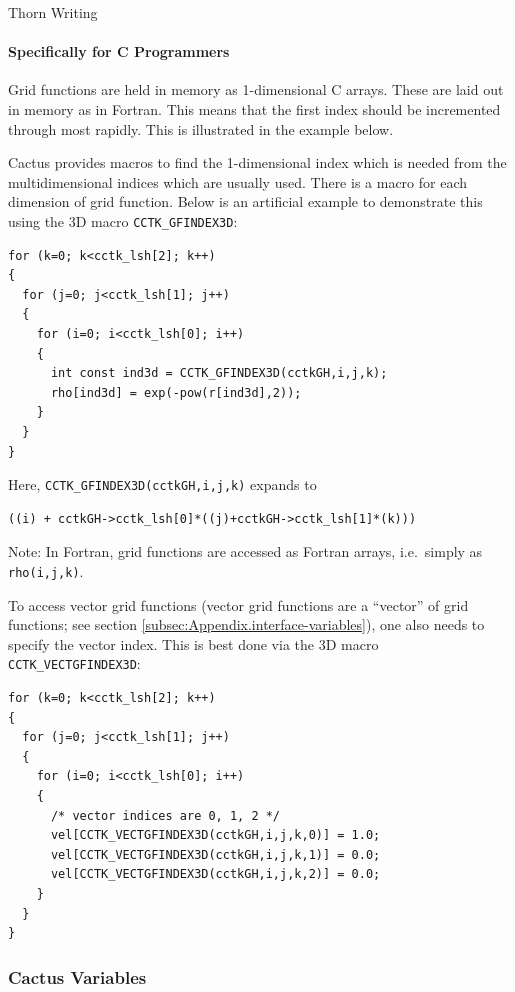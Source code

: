 \begin{cactuspart}{Thorn Writing}
\paragraph{Specifically for C Programmers}

Grid functions are held in memory as 1-dimensional C arrays. These are laid
out in memory as in Fortran. This means that the first index should
be incremented through most rapidly.  This is illustrated in the example
below.

Cactus provides
macros to find the 1-dimensional index which is needed from the multidimensional
indices which are usually used. There is a macro for each dimension of
grid function.  Below is an artificial example to demonstrate this
using the 3D macro \texttt{CCTK\_GFINDEX3D}:
\begin{verbatim}
for (k=0; k<cctk_lsh[2]; k++)
{
  for (j=0; j<cctk_lsh[1]; j++)
  {
    for (i=0; i<cctk_lsh[0]; i++)
    {
      int const ind3d = CCTK_GFINDEX3D(cctkGH,i,j,k);
      rho[ind3d] = exp(-pow(r[ind3d],2));
    }
  }
}
\end{verbatim}
%
Here, \verb|CCTK_GFINDEX3D(cctkGH,i,j,k)| expands to
\begin{verbatim}
((i) + cctkGH->cctk_lsh[0]*((j)+cctkGH->cctk_lsh[1]*(k)))
\end{verbatim}
%
Note: In Fortran, grid functions are accessed as Fortran arrays,
i.e.\ simply as \verb|rho(i,j,k)|.

To access vector grid functions (vector grid functions are a
``vector'' of grid functions; see section
\ref{subsec:Appendix.interface-variables}), one also needs to specify
the vector index. This is best done via the 3D macro
\texttt{CCTK\_VECTGFINDEX3D}:
\begin{verbatim}
for (k=0; k<cctk_lsh[2]; k++)
{
  for (j=0; j<cctk_lsh[1]; j++)
  {
    for (i=0; i<cctk_lsh[0]; i++)
    {
      /* vector indices are 0, 1, 2 */
      vel[CCTK_VECTGFINDEX3D(cctkGH,i,j,k,0)] = 1.0;
      vel[CCTK_VECTGFINDEX3D(cctkGH,i,j,k,1)] = 0.0;
      vel[CCTK_VECTGFINDEX3D(cctkGH,i,j,k,2)] = 0.0;
    }
  }
}
\end{verbatim}

\subsubsection{Cactus Variables}
\label{sec:cactus_variables_c}


\end{cactuspart}
